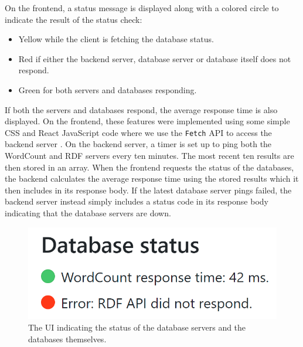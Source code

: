 On the frontend, a status message is displayed along with a colored circle to indicate the result of the status check:
\begin{itemize}
	\item Yellow while the client is fetching the database status.
	\item Red if either the backend server, database server or database itself does not respond.
	\item Green for both servers and databases responding.
\end{itemize}
If both the servers and databases respond, the average response time is also displayed.
On the frontend, these features were implemented using some simple CSS and React JavaScript code where we use the \texttt{Fetch} API to access the backend server . 
On the backend server, a timer is set up to ping both the WordCount and RDF servers every ten minutes.
The most recent ten results are then stored in an array.
When the frontend requests the status of the databases, the backend calculates the average response time using the stored results which it then includes in its response body.
If the latest database server pings failed, the backend server instead simply includes a status code in its response body indicating that the database servers are down.
\begin{figure}[htb!]
    \centering
    \includegraphics[scale=0.6]{Images/dbstatus.png}
    \caption{The UI indicating the status of the database servers and the databases themselves.}
    \label{dbstatusUI}
\end{figure}
